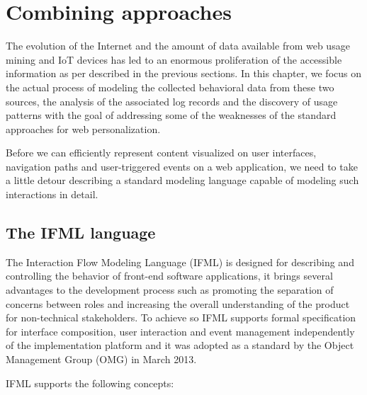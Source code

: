 \chead{}
\chapter{Combining approaches}

The evolution of the Internet and the amount of data available from web usage mining and IoT devices has led to an enormous proliferation of the accessible information as per described in the previous sections.  In this chapter, we focus on the actual process of modeling the collected behavioral data from these two sources, the analysis of the associated log records and the discovery of usage patterns with the goal of addressing some of the weaknesses of the standard approaches for web personalization.

Before we can efficiently represent content visualized on user interfaces, navigation paths and user-triggered events on a web application, we need to take a little detour describing a standard modeling language capable of modeling such interactions in detail.

\section{The IFML language}

The Interaction Flow Modeling Language (IFML)\cite{IFML-1, IFML-2} is designed for describing and controlling the behavior of front-end software applications, it brings several advantages to the development process such as promoting the separation of concerns between roles and increasing the overall understanding of the product for non-technical stakeholders. To achieve so IFML supports formal specification for interface composition, user interaction and event management independently of the implementation platform and it was adopted as a standard by the Object Management Group (OMG) in March 2013.

IFML supports the following concepts: 

